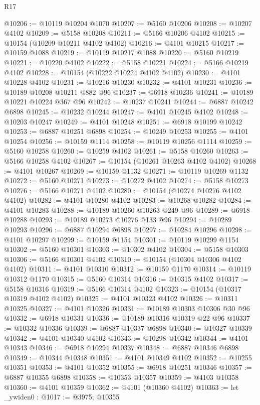 \begin{lexlean}{R17}
\begin{coremodule}
@10206 := @10119 @10204 @1070
@10207 := @5160 @10206
@10208 := @10207 @4102
@10209 := @5158 @10208
@10211 := @5166 @10206 @4102
@10215 := @10154 (@10209 @10211 @4102 @4102)
@10216 := @4101 @10215
@10217 := @10159 @1088
@10219 := @10119 @10217 @1088
@10220 := @5160 @10219
@10221 := @10220 @4102
@10222 := @5158 @10221
@10224 := @5166 @10219 @4102
@10228 := @10154 (@10222 @10224 @4102 @4102)
@10230 := @4101 @10228 @4102
@10231 := @10216 @10230
@10232 := @4101 @10231
@10236 := @10189 @10208 @10211 @882 @96
@10237 := @6918 @10236
@10241 := @10189 @10221 @10224 @367 @96
@10242 := @10237 @10241
@10244 := @6887 @10242 @6898
@10245 := @10232 @10244
@10247 := @4101 @10245 @4102
@10248 := @10203 @10247
@10249 := @4101 @10248
@10251 := @6918 @10199 @10242
@10253 := @6887 @10251 @6898
@10254 := @10249 @10253
@10255 := @4101 @10254
@10256 := @10159 @1114
@10258 := @10119 @10256 @1114
@10259 := @5160 @10258
@10260 := @10259 @4102
@10261 := @5158 @10260
@10263 := @5166 @10258 @4102
@10267 := @10154 (@10261 @10263 @4102 @4102)
@10268 := @4101 @10267
@10269 := @10159 @1132
@10271 := @10119 @10269 @1132
@10272 := @5160 @10271
@10273 := @10272 @4102
@10274 := @5158 @10273
@10276 := @5166 @10271 @4102
@10280 := @10154 (@10274 @10276 @4102 @4102)
@10282 := @4101 @10280 @4102
@10283 := @10268 @10282
@10284 := @4101 @10283
@10288 := @10189 @10260 @10263 @249 @96
@10289 := @6918 @10288
@10293 := @10189 @10273 @10276 @133 @96
@10294 := @10289 @10293
@10296 := @6887 @10294 @6898
@10297 := @10284 @10296
@10298 := @4101 @10297
@10299 := @10159 @1154
@10301 := @10119 @10299 @1154
@10302 := @5160 @10301
@10303 := @10302 @4102
@10304 := @5158 @10303
@10306 := @5166 @10301 @4102
@10310 := @10154 (@10304 @10306 @4102 @4102)
@10311 := @4101 @10310
@10312 := @10159 @1170
@10314 := @10119 @10312 @1170
@10315 := @5160 @10314
@10316 := @10315 @4102
@10317 := @5158 @10316
@10319 := @5166 @10314 @4102
@10323 := @10154 (@10317 @10319 @4102 @4102)
@10325 := @4101 @10323 @4102
@10326 := @10311 @10325
@10327 := @4101 @10326
@10331 := @10189 @10303 @10306 @30 @96
@10332 := @6918 @10331
@10336 := @10189 @10316 @10319 @22 @96
@10337 := @10332 @10336
@10339 := @6887 @10337 @6898
@10340 := @10327 @10339
@10342 := @4101 @10340 @4102
@10343 := @10298 @10342
@10344 := @4101 @10343
@10346 := @6918 @10294 @10337
@10348 := @6887 @10346 @6898
@10349 := @10344 @10348
@10351 := @4101 @10349 @4102
@10352 := @10255 @10351
@10353 := @4101 @10352
@10355 := @6918 @10251 @10346
@10357 := @6887 @10355 @6898
@10358 := @10353 @10357
@10359 := @4103 @10358
@10360 := @4101 @10359
@10362 := @4101 (@10360 @4102)
@10363 := let _ywiden0 : @1017 := @3975; @10355

\end{coremodule}
\end{lexlean}
